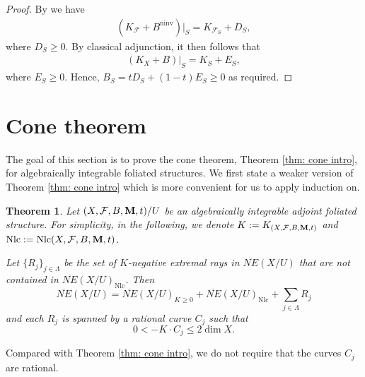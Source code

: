 \documentclass[12pt]{amsart}
\numberwithin{equation}{section}
\newcommand{\Mm}{{\bf{M}}}
\newcommand{\Qq}{\mathbb{Q}}
\newcommand{\ninv}{\operatorname{ninv}}
\newcommand{\Nlc}{\operatorname{Nlc}}
\newcommand{\mult}{\operatorname{mult}}
\newcommand{\Ff}{\mathcal{F}}
\newtheorem{thm}{Theorem}[section]
\theoremstyle{definition}
\theoremstyle{definition}
\theoremstyle{definition}
\begin{document}
\begin{proof}
By \cite[Proposition-Definition 3.7]{CS23b}
we have 
\begin{align*}
(K_{\mathcal F}+B^{\ninv})\vert_S = K_{\mathcal F_S}+D_S,
\end{align*}
where $D_S \ge 0$.
By classical adjunction, it then follows that  
\begin{align*}
(K_X+B)\vert_S = K_S+E_S, 
\end{align*}
where $E_S \ge 0$.
Hence,
$B_S = tD_S+(1-t)E_S \ge 0$
as required.

\iffalse
By localizing near codimension $2$ points on $X$ that are codimension $1$ points on $S$, we may assume that $X$ is a $\Qq$-factorial klt surface and the question is local near a closed point $x\in\tilde S$. Possibly replacing $B$, we may assume that $B=(t\epsilon_{\Ff}(S)+(1-t))S$. Then $(X,S)$ is plt, so near a neighborhood of $x$, by the usual adjunction formula, we have
$$(K_X+S)|_S=K_S+mx$$
where $m\in\{\frac{n-1}{n}\mid n\in\mathbb N^+\}$.

Let $f: (Y,\Ff_Y)\rightarrow (X,\Ff)$ be the minimal resolution of $\Ff$ (cf. \cite[Proposition 2.20]{Che23}) and let $K_{\Ff_Y}+\epsilon_{\Ff_W}(S_Y)S_Y+B_Y:=g^*(K_{\Ff}+\epsilon_{\Ff}(S)S)$, where $S_Y$ is the strict transform of $S$ on $Y$. Then $B_Y\geq 0$, so $B_Y|_{S_Y}\geq 0$. By
\cite[Proposition-Definition 3.7]{CS23b}
(cf. \cite[Proposition 2.2, 2.3]{Bru15}), 
$$(K_{\Ff_Y}+\epsilon_{\Ff_Y}(S_Y)S_Y)|_{S_Y^\nu}=K_{S_Y^\nu}+D_{S_Y}$$
for some $D\geq 0$, where $S_Y^\nu$ is the normalization of $S_Y$. Let $g_S: S_Y^\nu\rightarrow S$ be the induced birational morphism, then
$$(K_{\Ff}+\epsilon_{\Ff}(S)S)|_S=K_S+D_S$$
where $D_S=(g_S)_*D_{S_Y}\geq 0$. Therefore,
$$\mult_xB_S=t\mult_xD_S+(1-t)m\geq 0,$$
so $B_S\geq 0$ and we are done.
\fi
\end{proof}



\section{Cone theorem}\label{sec: cone}


The goal of this section is to prove the cone theorem, Theorem \ref{thm: cone intro}, for algebraically integrable foliated structures. We first state a weaker version of Theorem \ref{thm: cone intro} which is more convenient for us to apply induction on.

\begin{thm}\label{thm: cone}
      Let $(X,\Ff,B,\Mm,t)/U$ be an algebraically integrable adjoint foliated structure. For simplicity, in the following, we denote $K:=K_{(X,\Ff,B,\Mm,t)}$ and $\Nlc:=\Nlc(X,\Ff,B,\Mm,t)$. 
      
      Let $\{R_j\}_{j\in\Lambda}$ be the set of $K$-negative extremal rays in $\overline{NE}(X/U)$ that are not contained in $\overline{NE}(X/U)_{\Nlc}$.
      Then
    $$\overline{NE}(X/U)=\overline{NE}(X/U)_{K\geq 0}+\overline{NE}(X/U)_{\Nlc}+\sum_{j\in\Lambda}R_j$$
    and each $R_j$ is spanned by a rational curve $C_j$ such that
    $$0<-K\cdot C_j\leq 2\dim X.$$
\end{thm}
Compared with Theorem \ref{thm: cone intro}, we do not require that the curves $C_j$ are rational.
\end{document}
